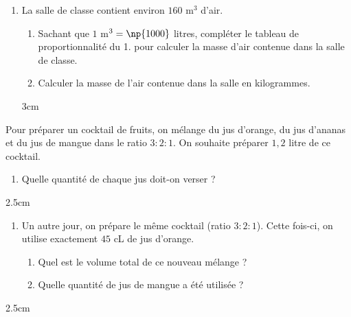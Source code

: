 \documentclass[a4paper]{book}
\begin{document}
{\begin{exercice}
\begin{enumerate}
\begin{enumerate}
                \item Quelle est la masse d'air ajoutée dans le ballon ?
            \end{enumerate}

            \begin{ZoneReponse}{3cm}
            \end{ZoneReponse}
            
            \item La salle de classe contient environ $160$ m$^3$ d'air. 
            \begin{enumerate}
                \item Sachant que $1$ m$^3 = \np{1000}$ litres, compléter le tableau de proportionnalité du 1. pour calculer la masse d'air contenue dans la salle de classe.

                \item Calculer la masse de l'air contenue dans la salle en kilogrammes. 
            \end{enumerate}
            

            \begin{ZoneReponse}{3cm}
            \end{ZoneReponse}
        \end{enumerate}
    \end{exercice}
    
        
    \begin{exercice}
        Pour préparer un cocktail de fruits, on mélange du jus d'orange, du jus d'ananas et du jus de mangue dans le ratio $3 : 2 : 1$.
        On souhaite préparer $1,2$ litre de ce cocktail.
        \medskip

        \begin{enumerate}
            \item Quelle quantité de chaque jus doit-on verser ?
        \end{enumerate}
        
        \begin{ZoneReponse}{2.5cm}
        \end{ZoneReponse}

        \begin{enumerate}[resume]
            \item Un autre jour, on prépare le même cocktail (ratio $3:2:1$). Cette fois-ci, on utilise exactement $45$ cL de jus d'orange.
            \begin{enumerate}
                \item Quel est le volume total de ce nouveau mélange ?
                \item Quelle quantité de jus de mangue a été utilisée ?
            \end{enumerate}
        \end{enumerate}

        \begin{ZoneReponse}{2.5cm}
        \end{ZoneReponse}
    \end{exercice}


}
\end{document}
